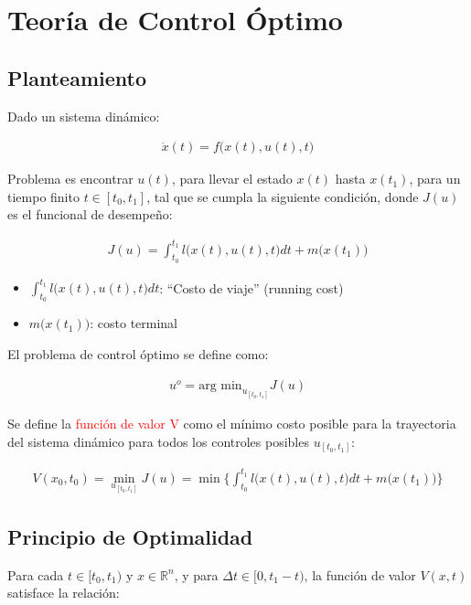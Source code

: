 \chapter{Teoría de Control Óptimo}

\section{Planteamiento}
Dado un sistema dinámico:

\begin{align*}
    \dot{x}(t)=f\big( x(t),u(t),t\big) 
\end{align*}

Problema es encontrar $u(t)$, para llevar el estado $x(t)$ hasta $x(t_1)$, para un tiempo finito $t\in[t_0,t_1]$, tal que se cumpla la siguiente condición, donde $J(u)$ es el funcional de desempeño:

\begin{align*}
    J(u)=\int_{t_0}^{t_1}l\big(x(t),u(t),t\big)dt+m\big(x(t_1)\big)
\end{align*}

\begin{itemize}
    \item $\int_{t_0}^{t_1}l\big(x(t),u(t),t\big)dt$: ``Costo de viaje'' (running cost)
    \item $m\big(x(t_1)\big)$: costo terminal
\end{itemize}

El problema de control óptimo se define como:

\begin{align*}
    u^o=\text{arg min}_{u_{[t_0,t_1]}}J(u)
\end{align*}

Se define la \textcolor{red}{función de valor V} como el mínimo costo posible para la trayectoria del sistema dinámico para todos los controles posibles $u_{[t_0,t_1]}$:

\begin{align*}
    V(x_0,t_0) = \min_{u_{[t_0,t_1]}}J(u) = \min\Big\{\int_{t_0}^{t_1}l\big(x(t),u(t),t\big)dt+m\big(x(t_1)\big)  \Big\}
\end{align*}

\section{Principio de Optimalidad}
Para cada $t\in[t_0,t_1)$ y $x\in\mathbb{R}^n$, y para $\Delta t\in[0,t_1-t)$, la función de valor $V(x,t)$ satisface la relación: 

